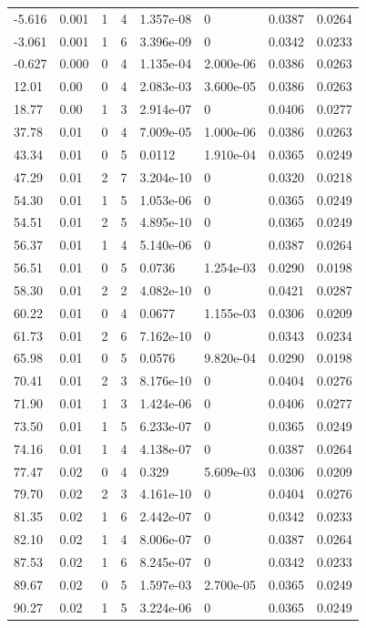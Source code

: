 \documentclass[preview]{standalone}
\begin{document}
{{\begin{tabular}{L{1.2cm}C{1.2cm} C{0.3cm}C{0.5cm} C{1.4cm}C{1.4cm} C{1.4cm}C{1.4cm}}
  -5.616  &  0.001  & 1     &  4 &  1.357e-08  & 0  & 0.0387 &  0.0264   \\ 
  -3.061  &  0.001  & 1     &  6 &  3.396e-09  & 0  & 0.0342 &  0.0233   \\ 
  -0.627  &  0.000  & 0     &  4 &  1.135e-04  & 2.000e-06  & 0.0386 &  0.0263   \\ 
  12.01  &  0.00  & 0     &  4 &  2.083e-03  & 3.600e-05  & 0.0386 &  0.0263   \\ 
  18.77  &  0.00  & 1     &  3 &  2.914e-07  & 0  & 0.0406 &  0.0277   \\ 
  37.78  &  0.01  & 0     &  4 &  7.009e-05  & 1.000e-06  & 0.0386 &  0.0263   \\ 
  43.34  &  0.01  & 0     &  5 &  0.0112  & 1.910e-04  & 0.0365 &  0.0249   \\ 
  47.29  &  0.01  & 2     &  7 &  3.204e-10  & 0  & 0.0320 &  0.0218   \\ 
  54.30  &  0.01  & 1     &  5 &  1.053e-06  & 0  & 0.0365 &  0.0249   \\ 
  54.51  &  0.01  & 2     &  5 &  4.895e-10  & 0  & 0.0365 &  0.0249   \\ 
  56.37  &  0.01  & 1     &  4 &  5.140e-06  & 0  & 0.0387 &  0.0264   \\ 
  56.51  &  0.01  & 0     &  5 &  0.0736  & 1.254e-03  & 0.0290 &  0.0198   \\ 
  58.30  &  0.01  & 2     &  2 &  4.082e-10  & 0  & 0.0421 &  0.0287   \\ 
  60.22  &  0.01  & 0     &  4 &  0.0677  & 1.155e-03  & 0.0306 &  0.0209   \\ 
  61.73  &  0.01  & 2     &  6 &  7.162e-10  & 0  & 0.0343 &  0.0234   \\ 
  65.98  &  0.01  & 0     &  5 &  0.0576  & 9.820e-04  & 0.0290 &  0.0198   \\ 
  70.41  &  0.01  & 2     &  3 &  8.176e-10  & 0  & 0.0404 &  0.0276   \\ 
  71.90  &  0.01  & 1     &  3 &  1.424e-06  & 0  & 0.0406 &  0.0277   \\ 
  73.50  &  0.01  & 1     &  5 &  6.233e-07  & 0  & 0.0365 &  0.0249   \\ 
  74.16  &  0.01  & 1     &  4 &  4.138e-07  & 0  & 0.0387 &  0.0264   \\ 
  77.47  &  0.02  & 0     &  4 &  0.329  & 5.609e-03  & 0.0306 &  0.0209   \\ 
  79.70  &  0.02  & 2     &  3 &  4.161e-10  & 0  & 0.0404 &  0.0276   \\ 
  81.35  &  0.02  & 1     &  6 &  2.442e-07  & 0  & 0.0342 &  0.0233   \\ 
  82.10  &  0.02  & 1     &  4 &  8.006e-07  & 0  & 0.0387 &  0.0264   \\ 
  87.53  &  0.02  & 1     &  6 &  8.245e-07  & 0  & 0.0342 &  0.0233   \\ 
  89.67  &  0.02  & 0     &  5 &  1.597e-03  & 2.700e-05  & 0.0365 &  0.0249   \\ 
  90.27  &  0.02  & 1     &  5 &  3.224e-06  & 0  & 0.0365 &  0.0249   \\ 
\hline 
\end{tabular} 

}}
\end{document}
